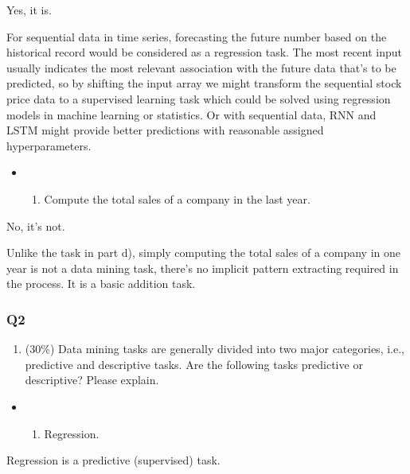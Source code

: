 \documentclass[11pt]{article}
\providecommand{\tightlist}{%
      \setlength{\itemsep}{0pt}\setlength{\parskip}{0pt}}
\begin{document}
    Yes, it is.

For sequential data in time series, forecasting the future number based
on the historical record would be considered as a regression task. The
most recent input usually indicates the most relevant association with
the future data that's to be predicted, so by shifting the input array
we might transform the sequential stock price data to a supervised
learning task which could be solved using regression models in machine
learning or statistics. Or with sequential data, RNN and LSTM might
provide better predictions with reasonable assigned hyperparameters.

    \begin{itemize}
\item
  \begin{enumerate}
  \def\labelenumi{\alph{enumi})}
  \setcounter{enumi}{4}
  \tightlist
  \item
    Compute the total sales of a company in the last year.
  \end{enumerate}
\end{itemize}

    No, it's not.

Unlike the task in part d), simply computing the total sales of a
company in one year is not a data mining task, there's no implicit
pattern extracting required in the process. It is a basic addition task.

    \subsubsection{Q2}\label{q2}

    \begin{enumerate}
\def\labelenumi{\arabic{enumi}.}
\setcounter{enumi}{1}
\tightlist
\item
  (30\%) Data mining tasks are generally divided into two major
  categories, i.e., predictive and descriptive tasks. Are the following
  tasks predictive or descriptive? Please explain.
\end{enumerate}

    \begin{itemize}
\item
  \begin{enumerate}
  \def\labelenumi{\alph{enumi})}
  \tightlist
  \item
    Regression.
  \end{enumerate}
\end{itemize}

Regression is a predictive (supervised) task.
\end{document}
